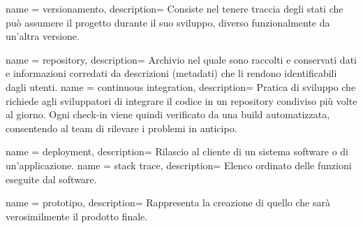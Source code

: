 {
  name = versionamento,
  description={
		Consiste nel tenere traccia degli stati che può assumere il progetto durante il suo sviluppo, diverso funzionalmente da un'altra versione. 
	}
}

 {
  name = repository,
  description={
		Archivio nel quale sono raccolti e conservati dati e informazioni corredati da descrizioni (metadati) che li rendono identificabili dagli utenti.
	}
}
 {
  name = continuous integration,
  description={
		Pratica di sviluppo che richiede agli sviluppatori di integrare il codice in un repository condiviso più volte al giorno. Ogni check-in viene quindi verificato da una build automatizzata, consentendo al team di rilevare i problemi in anticipo.
	}
}

 {
  name = deployment,
  description={
		Rilascio al cliente di un sistema software o di un’applicazione.
	}
}
 {
  name = stack trace,
  description={
		Elenco ordinato delle funzioni eseguite dal software.
	}
}

 {
  name = prototipo,
  description={
		Rappresenta la creazione di quello che sarà verosimilmente il prodotto finale.
	}
}

